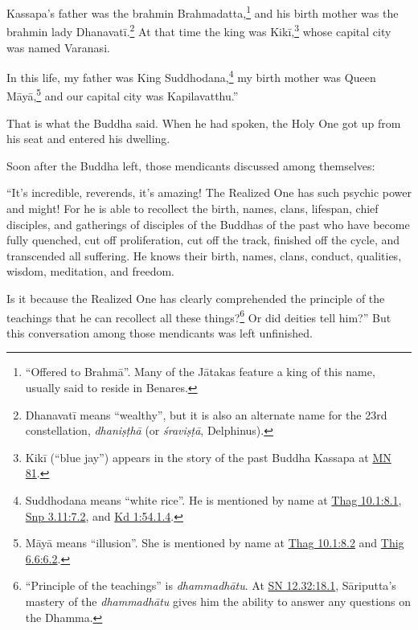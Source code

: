 \documentclass[12pt,openany]{book}%
\begin{document}
Kassapa’s father was the brahmin Brahmadatta,\footnote{“Offered to \textsanskrit{Brahmā}”. Many of the \textsanskrit{Jātakas} feature a king of this name, usually said to reside in Benares. } and his birth mother was the brahmin lady \textsanskrit{Dhanavatī}.\footnote{\textsanskrit{Dhanavatī} means “wealthy”, but it is also an alternate name for the 23rd constellation, \textit{\textsanskrit{dhaniṣṭhā}} (or \textit{\textsanskrit{śraviṣṭā}}, Delphinus). } At that time the king was \textsanskrit{Kikī},\footnote{\textsanskrit{Kikī} (“blue jay”) appears in the story of the past Buddha Kassapa at \href{https://suttacentral.net/mn81/en/sujato}{MN 81}. } whose capital city was named Varanasi. 

In this life, my father was King Suddhodana,\footnote{Suddhodana means “white rice”. He is mentioned by name at \href{https://suttacentral.net/thag10.1/en/sujato\#8.1}{Thag 10.1:8.1}, \href{https://suttacentral.net/snp3.11/en/sujato\#7.2}{Snp 3.11:7.2}, and \href{https://suttacentral.net/pli-tv-kd1/en/sujato\#54.1.4}{Kd 1:54.1.4}. } my birth mother was Queen \textsanskrit{Māyā},\footnote{\textsanskrit{Māyā} means “illusion”. She is mentioned by name at \href{https://suttacentral.net/thag10.1/en/sujato\#8.2}{Thag 10.1:8.2} and \href{https://suttacentral.net/thig6.6/en/sujato\#6.2}{Thig 6.6:6.2}. } and our capital city was Kapilavatthu.” 

That is what the Buddha said. When he had spoken, the Holy One got up from his seat and entered his dwelling. 

Soon after the Buddha left, those mendicants discussed among themselves: 

“It’s incredible, reverends, it’s amazing! The Realized One has such psychic power and might! For he is able to recollect the birth, names, clans, lifespan, chief disciples, and gatherings of disciples of the Buddhas of the past who have become fully quenched, cut off proliferation, cut off the track, finished off the cycle, and transcended all suffering. He knows their birth, names, clans, conduct, qualities, wisdom, meditation, and freedom. 

Is it because the Realized One has clearly comprehended the principle of the teachings that he can recollect all these things?\footnote{“Principle of the teachings” is \textit{\textsanskrit{dhammadhātu}}. At \href{https://suttacentral.net/sn12.32/en/sujato\#18.1}{SN 12.32:18.1}, \textsanskrit{Sāriputta}’s mastery of the \textit{\textsanskrit{dhammadhātu}} gives him the ability to answer any questions on the Dhamma. } Or did deities tell him?” But this conversation among those mendicants was left unfinished. 
\end{document}
